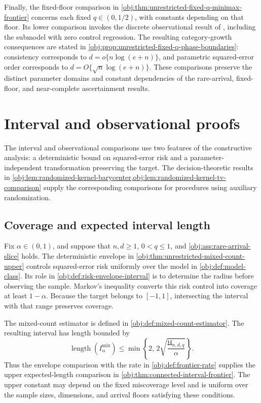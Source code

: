 \documentclass[11pt]{article}
\begin{document}
Finally, the fixed-floor comparison in \cref{obj:thm:unrestricted-fixed-q-minimax-frontier} concerns each fixed \(q\in(0,1/2)\), with constants depending on that floor. Its lower comparison invokes the discrete observational result of \citet[Theorem~2, Section~3.2, p.~9, and its proof in Section~C.5, pp.~39--44]{ZengBalakrishnanHanKennedy2026}, including the submodel with zero control regression. The resulting category-growth consequences are stated in \cref{obj:prop:unrestricted-fixed-q-phase-boundaries}: consistency corresponds to \(d=o\{n\log(e+n)\}\), and parametric squared-error order corresponds to \(d=O\{\sqrt n\log(e+n)\}\). These comparisons preserve the distinct parameter domains and constant dependencies of the rare-arrival, fixed-floor, and near-complete ascertainment results.


\section{Interval and observational proofs}

The interval and observational comparisons use two features of the constructive analysis: a deterministic bound on squared-error risk and a parameter-independent transformation preserving the target. The decision-theoretic results in \cref{obj:lem:randomized-kernel-barycenter,obj:lem:randomized-kernel-tv-comparison} supply the corresponding comparisons for procedures using auxiliary randomization.

\subsection{Coverage and expected interval length}

Fix \(\alpha\in(0,1)\), and suppose that \(n,d\ge1\), \(0<q\le1\), and \cref{obj:ass:rare-arrival-slice} holds. The deterministic envelope  in \cref{obj:thm:unrestricted-mixed-count-upper} controls squared-error risk uniformly over the model in \cref{obj:def:model-class}. Its role in \cref{obj:def:risk-envelope-interval} is to determine the radius before observing the sample. Markov's inequality converts this risk control into coverage at least \(1-\alpha\). Because the target belongs to \([-1,1]\), intersecting the interval with that range preserves coverage.

The mixed-count estimator  is defined in \cref{obj:def:mixed-count-estimator}. The resulting interval  has length bounded by
\[
\operatorname{length}(I^{\mathrm{mix}}_\alpha)
\le
\min\left\{2,\,
2\sqrt{\frac{\mathfrak U_{n,d,q}}{\alpha}}\right\}.
\]
Thus the envelope comparison with the rate  in \cref{obj:def:frontier-rate} supplies the upper expected-length comparison in \cref{obj:thm:connected-interval-frontier}. The upper constant  may depend on the fixed miscoverage level and is uniform over the sample sizes, dimensions, and arrival floors satisfying these conditions.
\end{document}
